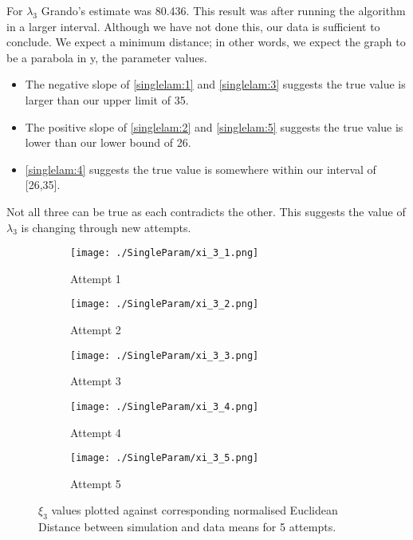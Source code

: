         For $\lambda_3$ Grando's estimate was 80.436. This result was after running the algorithm in a larger interval. Although we have not done this, our data is sufficient to conclude. We expect a minimum distance; in other words, we expect the graph to be a parabola in y, the parameter values.
        \begin{itemize}
            \item The negative slope of \ref{singlelam:1} and \ref{singlelam:3} suggests the true value is larger than our upper limit of 35. 
            \item The positive slope of \ref{singlelam:2} and \ref{singlelam:5} suggests the true value is lower than our lower bound of 26. 
            \item \ref{singlelam:4} suggests the true value is somewhere within our interval of [26,35]. 
        \end{itemize}
        Not all three can be true as each contradicts the other. This suggests the value of $\lambda_3$ is changing through new attempts.




        \begin{figure}
            \begin{subfigure}{.3\textwidth}
            \centering
            \texttt{[image: ./SingleParam/xi\_3\_1.png]}
            \caption{Attempt 1}
            \label{singlexi:1}
            \end{subfigure}
            \begin{subfigure}{.3\textwidth}
            \centering
            \texttt{[image: ./SingleParam/xi\_3\_2.png]}
            \caption{Attempt 2}
            \label{singlexi:2}
            \end{subfigure}
            \begin{subfigure}{.3\textwidth}
                \centering
                \texttt{[image: ./SingleParam/xi\_3\_3.png]}
                \caption{Attempt 3}
                \label{singlexi:3}
            \end{subfigure}
            
            \centering
            \begin{subfigure}{.3\textwidth} 
                \centering
                \texttt{[image: ./SingleParam/xi\_3\_4.png]}
                \caption{Attempt 4}
                \label{singlexi:4}
            \end{subfigure}
            \begin{subfigure}{.3\textwidth}
                \centering
                \texttt{[image: ./SingleParam/xi\_3\_5.png]}
                \caption{Attempt 5}
                \label{singlexi:5}
            \end{subfigure}

            \caption{$\xi_3$ values plotted against corresponding normalised Euclidean Distance between simulation and data means for 5 attempts.}
            \label{singlexi}
        \end{figure}


